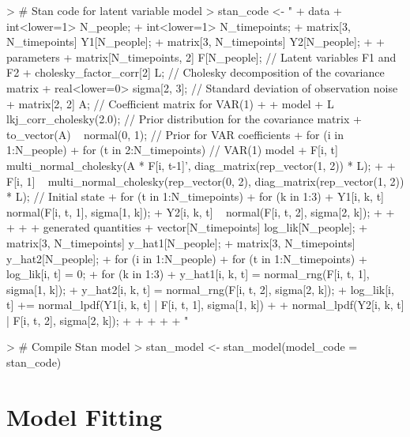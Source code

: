 \documentclass{article}
\begin{document}
\begin{Schunk}
\begin{Sinput}
> # Stan code for latent variable model
> stan_code <- "
+ data {
+   int<lower=1> N_people;
+   int<lower=1> N_timepoints;
+   matrix[3, N_timepoints] Y1[N_people];
+   matrix[3, N_timepoints] Y2[N_people];
+ }
+ parameters {
+   matrix[N_timepoints, 2] F[N_people]; // Latent variables F1 and F2
+   cholesky_factor_corr[2] L;           // Cholesky decomposition of the covariance matrix
+   real<lower=0> sigma[2, 3];           // Standard deviation of observation noise
+   matrix[2, 2] A;                      // Coefficient matrix for VAR(1)
+ }
+ model {
+   L ~ lkj_corr_cholesky(2.0); // Prior distribution for the covariance matrix
+   to_vector(A) ~ normal(0, 1); // Prior for VAR coefficients
+   for (i in 1:N_people) {
+     for (t in 2:N_timepoints) { // VAR(1) model
+       F[i, t] ~ multi_normal_cholesky(A * F[i, t-1]', diag_matrix(rep_vector(1, 2)) * L);
+     }
+     F[i, 1] ~ multi_normal_cholesky(rep_vector(0, 2), diag_matrix(rep_vector(1, 2)) * L); // Initial state
+     for (t in 1:N_timepoints) {
+       for (k in 1:3) {
+         Y1[i, k, t] ~ normal(F[i, t, 1], sigma[1, k]);
+         Y2[i, k, t] ~ normal(F[i, t, 2], sigma[2, k]);
+       }
+     }
+   }
+ }
+ generated quantities {
+   vector[N_timepoints] log_lik[N_people];
+   matrix[3, N_timepoints] y_hat1[N_people];
+   matrix[3, N_timepoints] y_hat2[N_people];
+   for (i in 1:N_people) {
+     for (t in 1:N_timepoints) {
+       log_lik[i, t] = 0;
+       for (k in 1:3) {
+         y_hat1[i, k, t] = normal_rng(F[i, t, 1], sigma[1, k]);
+         y_hat2[i, k, t] = normal_rng(F[i, t, 2], sigma[2, k]);
+         log_lik[i, t] += normal_lpdf(Y1[i, k, t] | F[i, t, 1], sigma[1, k]) +
+                          normal_lpdf(Y2[i, k, t] | F[i, t, 2], sigma[2, k]);
+       }
+     }
+   }
+ }
+ "
\end{Sinput}
\end{Schunk}

\begin{Schunk}
\begin{Sinput}
> # Compile Stan model
> stan_model <- stan_model(model_code = stan_code)
\end{Sinput}
\end{Schunk}

\section{Model Fitting}
\end{document}
